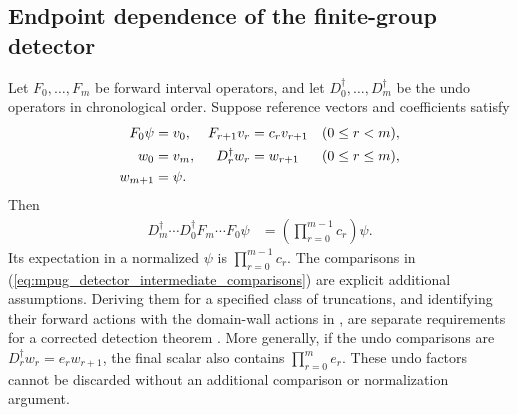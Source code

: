 \subsection{Endpoint dependence of the finite-group detector}

\begin{lemma}
    \label{lem:mpug_detector_conditional_transport}
    \leanok
    Let $F_0,\ldots,F_m$ be forward interval operators, and let
    $D_0^{\dagger},\ldots,D_m^{\dagger}$ be the undo operators in
    chronological order. Suppose reference vectors and coefficients satisfy
    \begin{align}
        F_0\psi & =v_0,  & F_{r+1}v_r       & =c_rv_{r+1} &  & (0\leq r<m),\notag     \\
        w_0     & =v_m,  & D_r^{\dagger}w_r & =w_{r+1}    &  & (0\leq r\leq m),\notag \\
        w_{m+1} & =\psi. &                  &             &  &
        \label{eq:mpug_detector_intermediate_comparisons}
    \end{align}
    Then
    \begin{align}
        D_m^{\dagger}\cdots D_0^{\dagger}F_m\cdots F_0\psi
         & =\left(\prod_{r=0}^{m-1}c_r\right)\psi.
        \label{eq:mpug_detector_conditional_transport}
    \end{align}
    Its expectation in a normalized $\psi$ is $\prod_{r=0}^{m-1}c_r$.
    The comparisons in (\ref{eq:mpug_detector_intermediate_comparisons})
    are explicit additional assumptions. Deriving them for a specified
    class of truncations, and identifying their forward actions with the
    domain-wall actions in \cite[Section~V]{GarreRubioSchuch2024DomainWall},
    are separate requirements for a corrected detection theorem
    \cite{gap:gs24_truncation_detector_endpoint_dependence}.
    More generally, if the undo comparisons are
    $D_r^{\dagger}w_r=e_rw_{r+1}$, the final scalar also contains
    $\prod_{r=0}^m e_r$. These undo factors cannot be discarded without
    an additional comparison or normalization argument.
\end{lemma}

